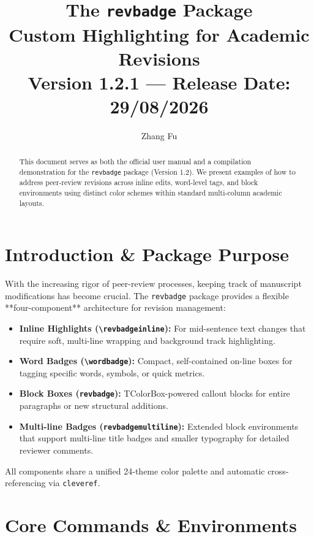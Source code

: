 \documentclass[10pt,journal,compsoc,twocolumn]{IEEEtran}
\begin{document}
\title{The \texttt{revbadge} Package \\ Custom Highlighting for Academic Revisions\\
\vspace{5px} \large Version 1.2.1 --- Release Date: 29/08/2026}
\author{Zhang Fu}
\maketitle

\begin{abstract}
This document serves as both the official user manual and a compilation demonstration for the \texttt{revbadge} package (Version 1.2). We present examples of how to address peer-review revisions across inline edits, word-level tags, and block environments using distinct color schemes within standard multi-column academic layouts.
\end{abstract}

\section{Introduction \& Package Purpose}
With the increasing rigor of peer-review processes, keeping track of manuscript modifications has become crucial. The \texttt{revbadge} package provides a flexible **four-component** architecture for revision management:
\begin{itemize}
  \item \textbf{Inline Highlights (\texttt{\textbackslash revbadgeinline}):} For mid-sentence text changes that require soft, multi-line wrapping and background track highlighting.
  \item \textbf{Word Badges (\texttt{\textbackslash wordbadge}):} Compact, self-contained on-line boxes for tagging specific words, symbols, or quick metrics.
  \item \textbf{Block Boxes (\texttt{revbadge}):} TColorBox-powered callout blocks for entire paragraphs or new structural additions.
  \item \textbf{Multi-line Badges (\texttt{revbadgemultiline}):} Extended block environments that support multi-line title badges and smaller typography for detailed reviewer comments.
\end{itemize}
All components share a unified 24-theme color palette and automatic cross-referencing via \texttt{cleveref}.

\section{Core Commands \& Environments}
\end{document}
